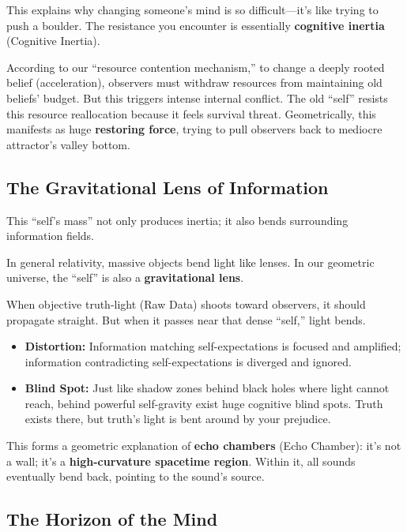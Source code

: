 This explains why changing someone's mind is so difficult---it's like trying to push a boulder. The resistance you encounter is essentially \textbf{cognitive inertia} (Cognitive Inertia).

According to our ``resource contention mechanism,'' to change a deeply rooted belief (acceleration), observers must withdraw resources from maintaining old beliefs' budget. But this triggers intense internal conflict. The old ``self'' resists this resource reallocation because it feels survival threat. Geometrically, this manifests as huge \textbf{restoring force}, trying to pull observers back to mediocre attractor's valley bottom.

\subsection{The Gravitational Lens of Information}

This ``self's mass'' not only produces inertia; it also bends surrounding information fields.

In general relativity, massive objects bend light like lenses. In our geometric universe, the ``self'' is also a \textbf{gravitational lens}.

When objective truth-light (Raw Data) shoots toward observers, it should propagate straight. But when it passes near that dense ``self,'' light bends.

\begin{itemize}
\item \textbf{Distortion:} Information matching self-expectations is focused and amplified; information contradicting self-expectations is diverged and ignored.

\item \textbf{Blind Spot:} Just like shadow zones behind black holes where light cannot reach, behind powerful self-gravity exist huge cognitive blind spots. Truth exists there, but truth's light is bent around by your prejudice.
\end{itemize}

This forms a geometric explanation of \textbf{echo chambers} (Echo Chamber): it's not a wall; it's a \textbf{high-curvature spacetime region}. Within it, all sounds eventually bend back, pointing to the sound's source.

\subsection{The Horizon of the Mind}

